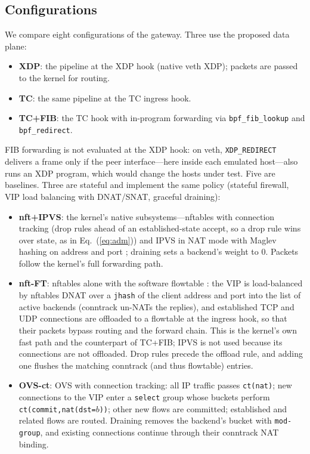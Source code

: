 \documentclass[conference]{IEEEtran}
\begin{document}
\subsection{Configurations}
We compare eight configurations of the gateway. Three use the proposed data
plane:
\begin{itemize}
\item \textbf{XDP}: the pipeline at the XDP hook (native veth XDP); packets are
passed to the kernel for routing.
\item \textbf{TC}: the same pipeline at the TC ingress hook.
\item \textbf{TC+FIB}: the TC hook with in-program forwarding via
\texttt{bpf\_fib\_lookup} and \texttt{bpf\_redirect}.
\end{itemize}
FIB forwarding is not evaluated at the XDP hook: on veth, \texttt{XDP\_REDIRECT}
delivers a frame only if the peer interface---here inside each emulated
host---also runs an XDP program, which would change the hosts under test.
Five are baselines. Three are stateful and implement the same policy (stateful
firewall, VIP load balancing with DNAT/SNAT, graceful draining):
\begin{itemize}
\item \textbf{nft+IPVS}: the kernel's native subsystems---nftables with
connection tracking (drop rules ahead of an established-state accept, so a
drop rule wins over state, as in Eq.~(\ref{eq:adm})) and IPVS in NAT mode with
Maglev hashing on address and port \cite{zhang2000lvs,nftables}; draining sets
a backend's weight to 0. Packets follow the kernel's full forwarding path.
\item \textbf{nft-FT}: nftables alone with the software flowtable
\cite{nfflowtable}: the VIP is load-balanced by nftables DNAT over a
\texttt{jhash} of the client address and port into the list of active
backends (conntrack un-NATs the replies), and established TCP and UDP
connections are offloaded to a flowtable at the ingress hook, so that their
packets bypass routing and the forward chain. This is the kernel's own fast
path and the counterpart of TC+FIB; IPVS is not used because its connections
are not offloaded. Drop rules precede the offload rule, and adding one
flushes the matching conntrack (and thus flowtable) entries.
\item \textbf{OVS-ct}: OVS with connection tracking: all IP traffic passes
\texttt{ct(nat)}; new connections to the VIP enter a \texttt{select} group
whose buckets perform \texttt{ct(commit,nat(dst=$b$))}; other new flows are
committed; established and related flows are routed. Draining removes the
backend's bucket with \texttt{mod-group}, and existing connections continue
through their conntrack NAT binding.
\end{itemize}
\end{document}
